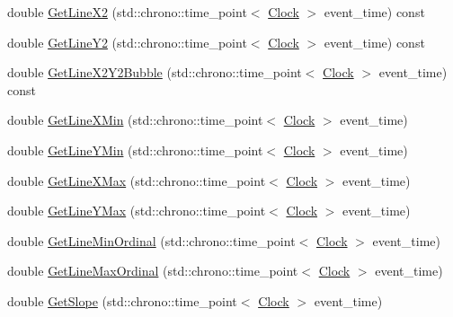 \begin{DoxyCompactItemize}
\item 
double \hyperlink{class_line_a9cdf38d7aaeadfa35136dd417865c189}{Get\+Line\+X2} (std\+::chrono\+::time\+\_\+point$<$ \hyperlink{universe_8h_a0ef8d951d1ca5ab3cfaf7ab4c7a6fd80}{Clock} $>$ event\+\_\+time) const
\item 
double \hyperlink{class_line_a6222d15f883f3183ec9eed085046916a}{Get\+Line\+Y2} (std\+::chrono\+::time\+\_\+point$<$ \hyperlink{universe_8h_a0ef8d951d1ca5ab3cfaf7ab4c7a6fd80}{Clock} $>$ event\+\_\+time) const
\item 
double \hyperlink{class_line_a2432406f734963e4497541081a843131}{Get\+Line\+X2\+Y2\+Bubble} (std\+::chrono\+::time\+\_\+point$<$ \hyperlink{universe_8h_a0ef8d951d1ca5ab3cfaf7ab4c7a6fd80}{Clock} $>$ event\+\_\+time) const
\item 
double \hyperlink{class_line_ac4a6e8f232b529169d91b9f44496933b}{Get\+Line\+X\+Min} (std\+::chrono\+::time\+\_\+point$<$ \hyperlink{universe_8h_a0ef8d951d1ca5ab3cfaf7ab4c7a6fd80}{Clock} $>$ event\+\_\+time)
\item 
double \hyperlink{class_line_ae8151f5f3b102924b09de686f536e220}{Get\+Line\+Y\+Min} (std\+::chrono\+::time\+\_\+point$<$ \hyperlink{universe_8h_a0ef8d951d1ca5ab3cfaf7ab4c7a6fd80}{Clock} $>$ event\+\_\+time)
\item 
double \hyperlink{class_line_a1393a4dcd9fa9e1ab1653c37d76c8c3a}{Get\+Line\+X\+Max} (std\+::chrono\+::time\+\_\+point$<$ \hyperlink{universe_8h_a0ef8d951d1ca5ab3cfaf7ab4c7a6fd80}{Clock} $>$ event\+\_\+time)
\item 
double \hyperlink{class_line_ab033cff3a24b67be829759d16f13c281}{Get\+Line\+Y\+Max} (std\+::chrono\+::time\+\_\+point$<$ \hyperlink{universe_8h_a0ef8d951d1ca5ab3cfaf7ab4c7a6fd80}{Clock} $>$ event\+\_\+time)
\item 
double \hyperlink{class_line_a7b105f0af704489446cc93302c30813d}{Get\+Line\+Min\+Ordinal} (std\+::chrono\+::time\+\_\+point$<$ \hyperlink{universe_8h_a0ef8d951d1ca5ab3cfaf7ab4c7a6fd80}{Clock} $>$ event\+\_\+time)
\item 
double \hyperlink{class_line_a3fc7779998759b641ec2b7bc8515563a}{Get\+Line\+Max\+Ordinal} (std\+::chrono\+::time\+\_\+point$<$ \hyperlink{universe_8h_a0ef8d951d1ca5ab3cfaf7ab4c7a6fd80}{Clock} $>$ event\+\_\+time)
\item 
double \hyperlink{class_line_a2be3926d47a1a8849007a6c29a603dcf}{Get\+Slope} (std\+::chrono\+::time\+\_\+point$<$ \hyperlink{universe_8h_a0ef8d951d1ca5ab3cfaf7ab4c7a6fd80}{Clock} $>$ event\+\_\+time)
\item 

\end{DoxyCompactItemize}
